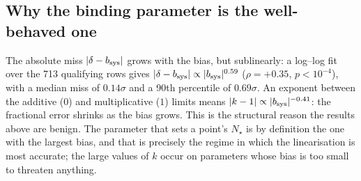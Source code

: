 \documentclass[11pt,a4paper]{article}
\begin{document}
\subsection{Why the binding parameter is the well-behaved one}
The absolute miss $|\delta-b_{\rm sys}|$ grows with the bias, but sublinearly:
a log--log fit over the 713 qualifying rows gives
$|\delta-b_{\rm sys}|\propto|b_{\rm sys}|^{0.59}$
($\rho=+0.35$, $p<10^{-4}$), with a median miss of $0.14\sigma$ and a 90th
percentile of $0.69\sigma$. An exponent between the additive ($0$) and
multiplicative ($1$) limits means
$|k-1|\propto|b_{\rm sys}|^{-0.41}$: the fractional error shrinks as the bias
grows. This is the structural reason the results above are benign. The
parameter that sets a point's $N_\star$ is by definition the one with the
largest bias, and that is precisely the regime in which the linearisation is
most accurate; the large values of $k$ occur on parameters whose bias is too
small to threaten anything.
\end{document}
